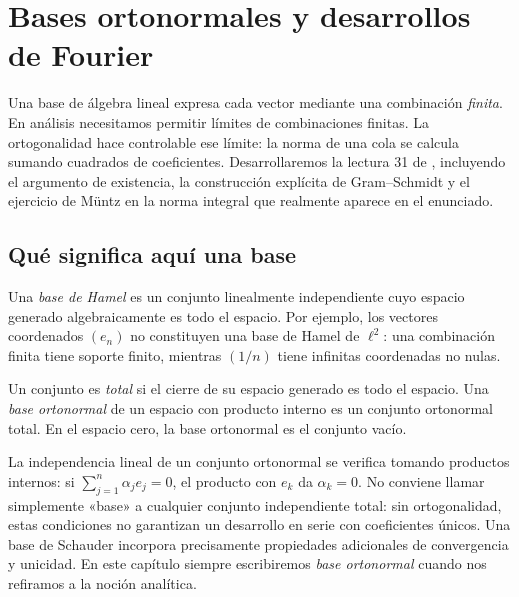 \chapter{Bases ortonormales y desarrollos de Fourier}\label{chap:31}

Una base de álgebra lineal expresa cada vector mediante una combinación \emph{finita}. En análisis necesitamos permitir límites de combinaciones finitas. La ortogonalidad hace controlable ese límite: la norma de una cola se calcula sumando cuadrados de coeficientes. Desarrollaremos la lectura 31 de \cite{valencia}, incluyendo el argumento de existencia, la construcción explícita de Gram--Schmidt y el ejercicio de Müntz en la norma integral que realmente aparece en el enunciado.

\section{Qué significa aquí una base}
Una \emph{base de Hamel} es un conjunto linealmente independiente cuyo espacio generado algebraicamente es todo el espacio. Por ejemplo, los vectores coordenados $(e_n)$ no constituyen una base de Hamel de $\ell^{2}$: una combinación finita tiene soporte finito, mientras $(1/n)$ tiene infinitas coordenadas no nulas.

\begin{definicion}
Un conjunto es \emph{total} si el cierre de su espacio generado es todo el espacio. Una \emph{base ortonormal} de un espacio con producto interno es un conjunto ortonormal total. En el espacio cero, la base ortonormal es el conjunto vacío.
\end{definicion}
La independencia lineal de un conjunto ortonormal se verifica tomando productos internos: si $\sum_{j=1}^{n}\alpha_je_j=0$, el producto con $e_k$ da $\alpha_k=0$. No conviene llamar simplemente «base» a cualquier conjunto independiente total: sin ortogonalidad, estas condiciones no garantizan un desarrollo en serie con coeficientes únicos. Una base de Schauder incorpora precisamente propiedades adicionales de convergencia y unicidad. En este capítulo siempre escribiremos \emph{base ortonormal} cuando nos refiramos a la noción analítica.

